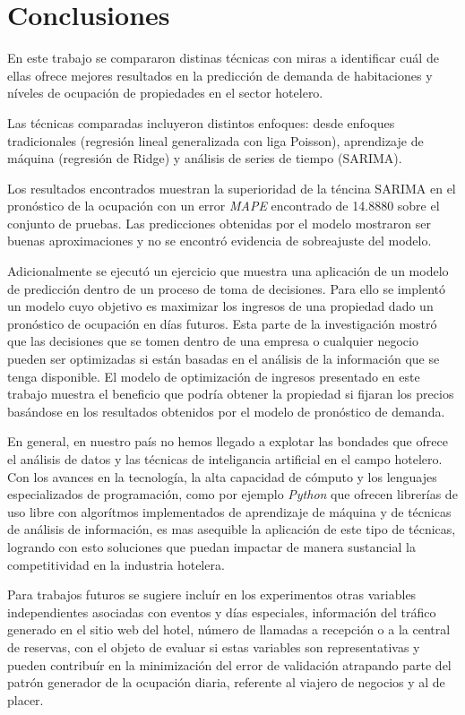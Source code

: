\chapter{Conclusiones}
\label{ch:conclusiones}

En este trabajo se compararon distinas técnicas con miras a identificar cuál de ellas ofrece mejores resultados en la predicción de demanda de habitaciones y níveles de ocupación de propiedades en el sector hotelero.

Las técnicas comparadas incluyeron distintos enfoques: desde enfoques tradicionales (regresión lineal generalizada con liga Poisson), aprendizaje de máquina (regresión de Ridge) y análisis de series de tiempo (SARIMA). 

Los resultados encontrados muestran la superioridad de la téncina SARIMA en el pronóstico de la ocupación con un error \emph{MAPE} encontrado de 14.8880 sobre el conjunto de pruebas. Las predicciones obtenidas por el modelo mostraron ser buenas aproximaciones y no se encontró evidencia de sobreajuste del modelo.

Adicionalmente se ejecutó un ejercicio que muestra una aplicación de un modelo de predicción dentro de un proceso de toma de decisiones. Para ello se implentó un modelo cuyo objetivo es maximizar los ingresos de una propiedad dado un pronóstico de ocupación en días futuros. Esta parte de la investigación mostró que las decisiones que se tomen dentro de una empresa o cualquier negocio pueden ser optimizadas si están basadas en el análisis de la información que se tenga disponible. El modelo de optimización de ingresos presentado en este trabajo muestra el beneficio que podría obtener la propiedad si fijaran los precios basándose en los resultados obtenidos por el modelo de pronóstico de demanda.

En general, en nuestro país no hemos llegado a explotar las bondades que ofrece el análisis de datos y las técnicas de inteligancia artificial en el campo hotelero. Con los avances en la tecnología, la alta capacidad de cómputo y los lenguajes especializados de programación, como por ejemplo \emph{Python} que ofrecen librerías de uso libre con algorítmos implementados de aprendizaje de máquina y de técnicas de análisis de información, es mas asequible la aplicación de este tipo de técnicas, logrando con esto soluciones que puedan impactar de manera sustancial la competitividad en la industria hotelera.

Para trabajos futuros se sugiere incluír en los experimentos otras variables independientes asociadas con eventos y días especiales, información del tráfico generado en el sitio web del hotel, número de llamadas a recepción o a la central de reservas, con el objeto de evaluar si estas variables son representativas y pueden contribuír en la minimización del error de validación atrapando parte del patrón generador de la ocupación diaria, referente al viajero de negocios y al de placer.

